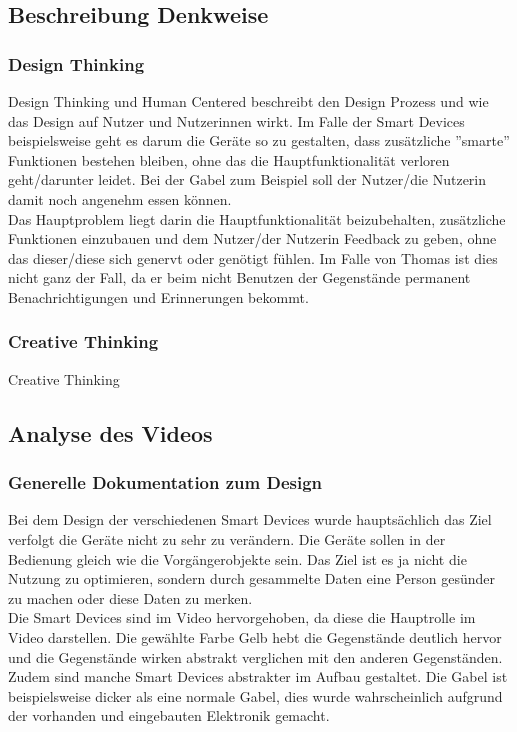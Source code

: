 
\subsection{Beschreibung Denkweise}
\subsubsection{\textbf{Design Thinking}}
Design Thinking und Human Centered\cite{slidesDesign} beschreibt den Design Prozess und wie das Design auf Nutzer und Nutzerinnen wirkt. Im Falle der Smart Devices beispielsweise geht es darum die Geräte so zu gestalten, dass zusätzliche ''smarte'' Funktionen bestehen bleiben, ohne das die Hauptfunktionalität verloren geht/darunter leidet. Bei der Gabel zum Beispiel soll der Nutzer/die Nutzerin damit noch angenehm essen können. \\
Das Hauptproblem liegt darin die Hauptfunktionalität beizubehalten, zusätzliche Funktionen einzubauen und dem Nutzer/der Nutzerin Feedback zu geben, ohne das dieser/diese sich genervt oder genötigt fühlen. Im Falle von Thomas\cite{uninvatedGuests} ist dies nicht ganz der Fall, da er beim nicht Benutzen der Gegenstände permanent Benachrichtigungen und Erinnerungen bekommt.
\subsubsection{\textbf{Creative Thinking}}
Creative Thinking\cite{slidesCreative}
\subsection{Analyse des Videos}
\subsubsection{\textbf{Generelle Dokumentation zum Design}} 
Bei dem Design der verschiedenen Smart Devices wurde hauptsächlich das Ziel verfolgt die Geräte nicht zu sehr zu verändern. Die Geräte sollen in der Bedienung gleich wie die Vorgängerobjekte sein. Das Ziel ist es ja nicht die Nutzung zu optimieren, sondern durch gesammelte Daten eine Person gesünder zu machen oder diese Daten zu merken. \\
Die Smart Devices sind im Video hervorgehoben, da diese die Hauptrolle im Video darstellen. Die gewählte Farbe Gelb hebt die Gegenstände deutlich hervor und die Gegenstände wirken abstrakt verglichen mit den anderen Gegenständen. Zudem sind manche Smart Devices abstrakter im Aufbau gestaltet. Die Gabel ist beispielsweise dicker als eine normale Gabel, dies wurde wahrscheinlich aufgrund der vorhanden und eingebauten Elektronik gemacht. \\
